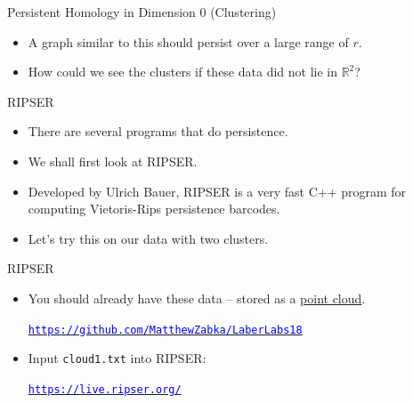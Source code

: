 \documentclass[usenames,dvipsnames,aspectratio=1610]{beamer}
\begin{document}
\begin{frame}{Persistent Homology in Dimension 0 (Clustering)}
\begin{center}
\end{center}
\begin{itemize}
\item<1-> A graph similar to this should persist over a large range of $r$.
\item<2-> How could we see the clusters if these data did not lie in $\mathbb{R}^2$?
\end{itemize}
\end{frame}
\begin{frame}{RIPSER}
\begin{itemize}
\item<1-> There are several programs that do persistence.
\item<2-> We shall first look at RIPSER.
\item<3-> Developed by Ulrich Bauer, RIPSER is a very fast C++ program for computing Vietoris-Rips persistence barcodes.
\item<4-> Let's try this on our data with two clusters.
\end{itemize}
\end{frame}
\begin{frame}{RIPSER}
\begin{center}
\end{center}
\begin{itemize}
\item<1-> You should already have these data -- stored as a \underline{point cloud}.
\begin{center}
\hyperref[https://github.com/MatthewZabka/LaberLabs18]{\textcolor{blue}{\texttt{https://github.com/MatthewZabka/LaberLabs18}}}
\end{center}
\item<2-> Input \texttt{cloud1.txt} into RIPSER:
\begin{center}
\hyperref[https://live.ripser.org/]{\textcolor{blue}{\texttt{https://live.ripser.org/}}}
\end{center}
\end{itemize}
\end{frame}
\end{document}
